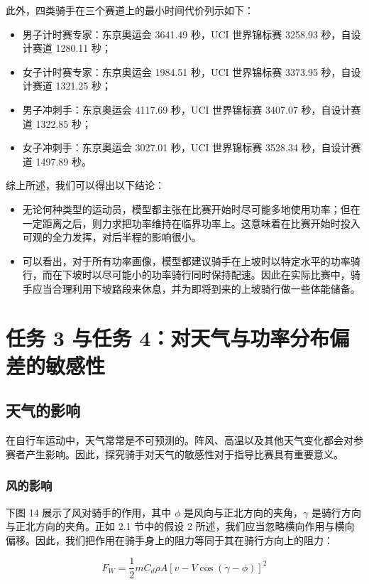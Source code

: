 \documentclass[11pt,a4paper]{ctexart}
\begin{document}
此外，四类骑手在三个赛道上的最小时间代价列示如下：

\begin{itemize}
\item 男子计时赛专家：东京奥运会 3641.49 秒，UCI 世界锦标赛 3258.93 秒，自设计赛道 1280.11 秒；
\item 女子计时赛专家：东京奥运会 1984.51 秒，UCI 世界锦标赛 3373.95 秒，自设计赛道 1321.25 秒；
\item 男子冲刺手：东京奥运会 4117.69 秒，UCI 世界锦标赛 3407.07 秒，自设计赛道 1322.85 秒；
\item 女子冲刺手：东京奥运会 3027.01 秒，UCI 世界锦标赛 3528.34 秒，自设计赛道 1497.89 秒。
\end{itemize}

综上所述，我们可以得出以下结论：

\begin{itemize}
\item 无论何种类型的运动员，模型都主张在比赛开始时尽可能多地使用功率；但在一定距离之后，则力求把功率维持在临界功率上。这意味着在比赛开始时投入可观的全力发挥，对后半程的影响很小。
\item 可以看出，对于所有功率画像，模型都建议骑手在上坡时以特定水平的功率骑行，而在下坡时以尽可能小的功率骑行同时保持配速。因此在实际比赛中，骑手应当合理利用下坡路段来休息，并为即将到来的上坡骑行做一些体能储备。
\end{itemize}
\section{任务 3 与任务 4：对天气与功率分布偏差的敏感性}

\subsection{天气的影响}

在自行车运动中，天气常常是不可预测的。阵风、高温以及其他天气变化都会对参赛者产生影响。因此，探究骑手对天气的敏感性对于指导比赛具有重要意义。

\subsubsection{风的影响}

下图 14 展示了风对骑手的作用，其中 $\phi$ 是风向与正北方向的夹角，$\gamma$ 是骑行方向与正北方向的夹角。正如 2.1 节中的假设 2 所述，我们应当忽略横向作用与横向偏移。因此，我们把作用在骑手身上的阻力等同于其在骑行方向上的阻力：

\[
F_W=\frac{1}{2}mC_d\rho A\left[v-V\cos(\gamma-\phi)\right]^{2}
\]
\end{document}
